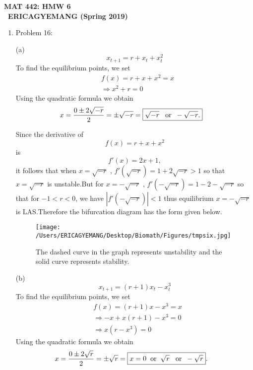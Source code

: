 \documentclass[12pt]{article}
\begin{document}
\begin{center}
\textbf{ MAT 442: HMW 6}\\
\textbf{\ ERICAGYEMANG (Spring 2019)}\\
\end{center}

\begin{enumerate} 
\item Problem 16:

(a) \[x_{t+1}=r+x_t+x^2_t\] 
To find the equilibrium points, we set 
\begin{align*}
&f(x)=r+x+x^2=x\\
&\Rightarrow x^2+r=0
\end{align*}
Using the quadratic formula we obtain
\begin{align*}
x&=\frac{0\pm 2\sqrt{-r}}{2}= \pm \sqrt{-r}=\boxed{ \sqrt{-r} \hspace{0.3cm}\mbox{or}\hspace{0.2cm} -\sqrt{-r}.}
\end{align*}

Since the derivative of 
\[f(x)=r+x+x^2\]
is
\[\boxed{f'(x)=2x+1},\]
it follows that when $x=\sqrt{-r}$ , $f'(\sqrt{-r})=1+2\sqrt{-r}>1$ so that $x=\sqrt{-r}$ is unstable.But for $x=-\sqrt{-r}$ , $f'(-\sqrt{-r})=1-2-\sqrt{-r}$ so that for $-1<r<0$, we have $\left|f'(-\sqrt{-r})\right|<1$ thus equilibrium $x=-\sqrt{-r}$ is LAS.Therefore the bifurcation diagram has the form given below.

\begin{figure} [ht!]
 \centering
 \texttt{[image: /Users/ERICAGYEMANG/Desktop/Biomath/Figures/tmpsix.jpg]} 
        \caption[Figure 2.4: r>1]{The dashed curve in the graph represents unstability and the solid curve represents stability.}
 \label{fig::model}
\end{figure}


\cleardoublepage
(b) \[x_{t+1}=(r+1)x_t-x_t^3\] 
To find the equilibrium points, we set 
\begin{align*}
&f(x)=(r+1)x-x^3=x\\
&\Rightarrow -x+x(r+1)-x^3=0\\
&\Rightarrow x(r-x^3)=0
\end{align*}
Using the quadratic formula we obtain
\begin{align*}
x&=\frac{0\pm 2\sqrt{r}}{2}= \pm \sqrt{r}=\boxed{ x=0\hspace{0.2cm} \mbox{or} \hspace{0.2cm} \sqrt{r} \hspace{0.3cm}\mbox{or}\hspace{0.2cm} -\sqrt{r}}.
\end{align*}


\end{enumerate}
\end{document}
